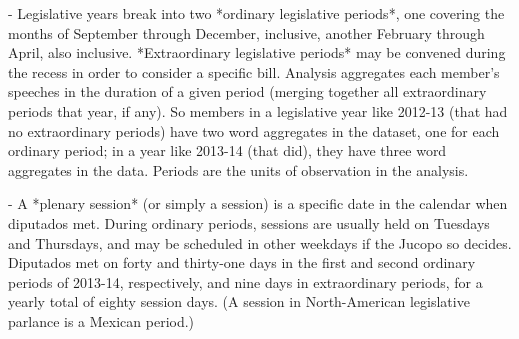\documentclass[letter,12pt]{article}
\begin{document}
- Legislative years break into two *ordinary legislative periods*, one covering the months of September through December, inclusive, another February through April, also inclusive. *Extraordinary legislative periods* may be convened during the recess in order to consider a specific bill. Analysis aggregates each member's speeches in the duration of a given period (merging together all extraordinary periods that year, if any). So members in a legislative year like 2012-13 (that had no extraordinary periods) have two word aggregates in the dataset, one for each ordinary period; in a year like 2013-14 (that did), they have three word aggregates in the data. Periods are the units of observation in the analysis. 

- A *plenary session* (or simply a session) is a specific date in the calendar when diputados met. During ordinary periods, sessions are usually held on Tuesdays and Thursdays, and may be scheduled in other weekdays if the Jucopo so decides. Diputados met on forty and thirty-one days in the first and second ordinary periods of 2013-14, respectively, and nine days in extraordinary periods, for a yearly total of eighty session days. (A session in North-American legislative parlance is a Mexican period.)
\end{document}
